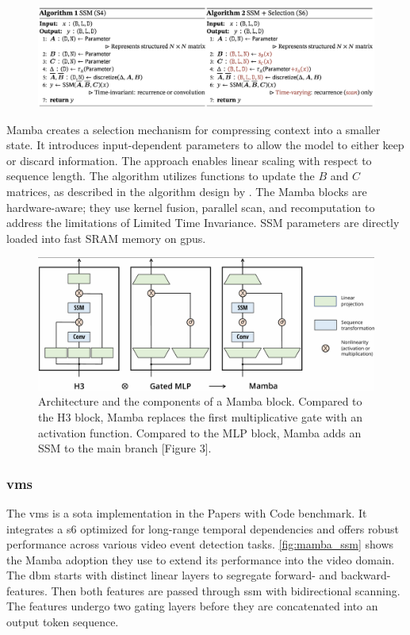 \begin{figure}[h]
    \centering
    \includegraphics[width=1\linewidth]{figures/mamba_algorithm.png}
\end{figure}

Mamba\cite{gu_mamba_2024} creates a selection mechanism for compressing context into a smaller state. It introduces input-dependent parameters to allow the model to either keep or discard information. The approach enables linear scaling with respect to sequence length. The algorithm utilizes functions to update the \(B\) and \(C\) matrices, as described in the algorithm design by \textcite{gu_mamba_2024}. The Mamba blocks are hardware-aware; they use kernel fusion, parallel scan, and recomputation to address the limitations of Limited Time Invariance. SSM parameters are directly loaded into fast SRAM memory on \acrshort{gpu}s. 


\begin{figure}
    \centering
    \includegraphics[width=\linewidth]{figures/h3_mlp_mamba.png}
    \caption{Architecture and the components of a Mamba block.  Compared to the H3 block, Mamba replaces the first multiplicative gate with an activation function. Compared to the MLP block, Mamba adds an SSM to the main branch \cite{gu_mamba_2024}[Figure 3].} 
    \label{fig:h3_mlp_mamba}
\end{figure}



\subsubsection{\acrfull{vms}}
The \acrfull{vms} is a \acrfull{sota} implementation in the Papers with Code benchmark. It integrates a \acrlong{s6} optimized for long-range temporal dependencies and offers robust performance across various video event detection tasks. \cref{fig:mamba_ssm} shows the Mamba adoption they use to extend its performance into the video domain. The \acrfull{dbm} starts with distinct linear layers to segregate forward- and backward-features. Then both features are passed through \acrshort{ssm} with bidirectional scanning. The features undergo two gating layers before they are concatenated into an output token sequence\cite{li_videomamba_2024}. 


